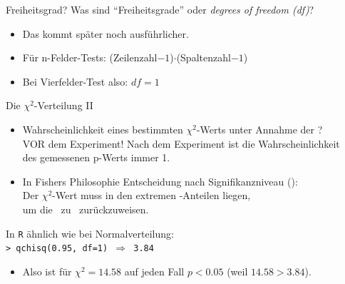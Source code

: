 \begin{frame}
  {Freiheitsgrad?}
  Was sind \alert{"`Freiheitsgrade"'} oder \textit{degrees of freedom (df)}?

  \begin{itemize}[<+->]
    \item Das kommt später noch ausführlicher.
    \item Für n-Felder-Tests: \alert{(Zeilenzahl$-1$)$\cdot$(Spaltenzahl$-1$)}
    \item Bei Vierfelder-Test also: $df=1$
  \end{itemize}
\end{frame}

\begin{frame}{Die $\chi^2$-Verteilung II}
  \begin{itemize}[<+->]
    \item Wahrscheinlichkeit eines bestimmten $\chi^2$-Werts unter Annahme der \Null?\\
      \alert{VOR dem Experiment! Nach dem Experiment ist die Wahrscheinlichkeit\\
      des gemessenen p-Werts immer 1.}
      \vspace{\baselineskip}
    \item In Fishers Philosophie Entscheidung nach \alert{Signifikanzniveau} (\Sig):\\
      \alert{Der $\chi^2$-Wert muss in den extremen \Sig-Anteilen liegen,\\
      um die \Null\ zu \Sig\ zurückzuweisen.}
  \end{itemize}
  \pause
  \begin{center}
    In \texttt{R} ähnlich wie bei Normalverteilung:\\
    \texttt{> qchisq(0.95, df=1) $\Rightarrow$ \texttt{3.84}}
  \end{center}
  \pause
  \begin{itemize}
    \item Also ist für $\chi^2=14.58$ auf jeden Fall $p<0.05$ (weil $14.58>3.84$).
  \end{itemize}
\end{frame}


